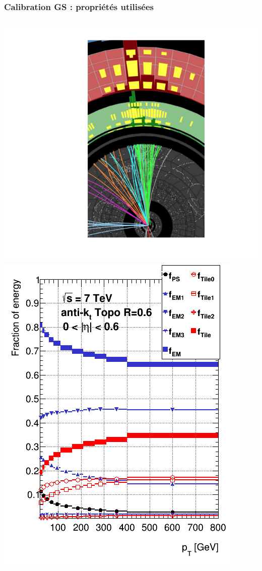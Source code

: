 \begin{frame}
\frametitle{Calibration GS : propri\'et\'es utilis\'ees}
\begin{columns}
\begin{column}{0.6\textwidth}
\begin{center}
\hspace*{-2cm}
\includegraphics[width=.9\textwidth]{Figures/JES/EventDisplayJet_modified.png}
\hspace*{-1.2cm}
\includegraphics[width=.62\textwidth]{Figures/JES/c_fracs_vs_pt.png}
\end{center}

\end{column}
\end{columns}
\end{frame}

